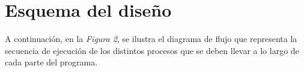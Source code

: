 \documentclass{article}
\begin{document}
\section{Esquema del diseño}

	A continuación, en la \textit{Figura 2}, se ilustra el diagrama de flujo que representa la secuencia de ejecución de los distintos procesos que se deben llevar a lo largo de cada parte del programa.

\end{document}
